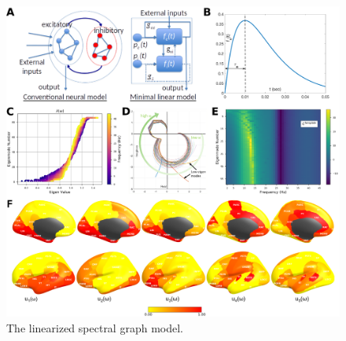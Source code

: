 \begin{figure}[htbp]
    \centering
    \includegraphics[scale=0.83]{../figures/chapter5/figure1.png}
    \caption{The linearized  spectral graph model.}

\end{figure}
